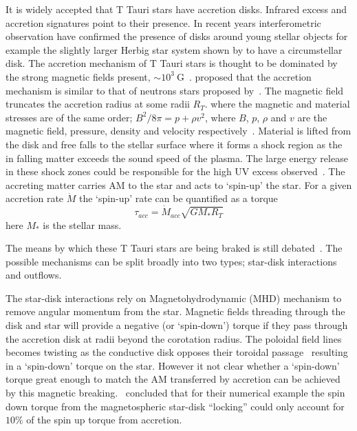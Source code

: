 \documentclass[fleqn,usenatbib]{mnras}
\begin{document}
It is widely accepted that T Tauri stars have
accretion disks. Infrared excess and accretion
signatures point to their presence. In recent years
interferometric observation have confirmed the
presence of disks around young stellar objects for
example the slightly larger Herbig star system shown
by \cite{2012ApJ...752...11K} to have a circumstellar
disk. The accretion mechanism of T Tauri stars is
thought to be dominated by the strong magnetic fields
present, $\sim 10^{3}~\textrm{G}$~\citep{2012MNRAS.426.2901K}.
\citet{1991ApJ...370L..39K} proposed that the accretion mechanism is
similar to that of neutrons stars proposed
by~\citet{1977ApJ...217..578G}. The magnetic field truncates the
accretion radius at some radii $R_T$. where the magnetic and material
stresses are of the same order; $B^2/8\pi = p + \rho v^2$, where $B$,
$p$, $\rho$ and $v$ are the magnetic field, pressure, density and
velocity respectively~\citep{Romanova:2002hc}. Material is lifted from
the disk and free falls to the stellar surface where it forms a shock region as the in falling matter exceeds the sound speed of the plasma. The large energy release in these shock zones could be responsible for the high UV excess observed~\citep{2009A&A...508.1117Z}. The accreting matter carries AM to the star and acts to `spin-up' the star. For a given accretion rate $\dot{M}$ the `spin-up' rate can be quantified as a torque~\citep{2005ApJ...632L.135M}
\begin{equation}
    \tau_{acc} = \dot{M}_{acc}\sqrt{GM_{\ast}R_T}
    \label{eq:accretion_torque}
\end{equation}
here $M_{\ast}$ is the stellar mass. 

The means by which these T Tauri stars are being braked is still debated~\citep{Hartmann:2016gu}. The possible mechanisms can be split broadly into two types; star-disk interactions and outflows. 

The star-disk interactions rely on Magnetohydrodynamic (MHD) mechanism to remove angular momentum from the star. Magnetic fields threading through the disk and star will provide a negative (or `spin-down') torque if they pass through the accretion disk at radii beyond the corotation radius. The poloidal field lines becomes twisting as the conductive disk opposes their toroidal passage~\citep{Uzdensky:2002dg} resulting in a `spin-down' torque on the star. 
However it not clear whether a `spin-down' torque great enough to match the AM transferred by accretion can be achieved by this magnetic breaking.~\citet{2009A&A...508.1117Z} concluded that for their numerical example the spin down torque from the magnetospheric star-disk ``locking'' could only account for $10\%$ of the spin up torque from accretion.
\end{document}
